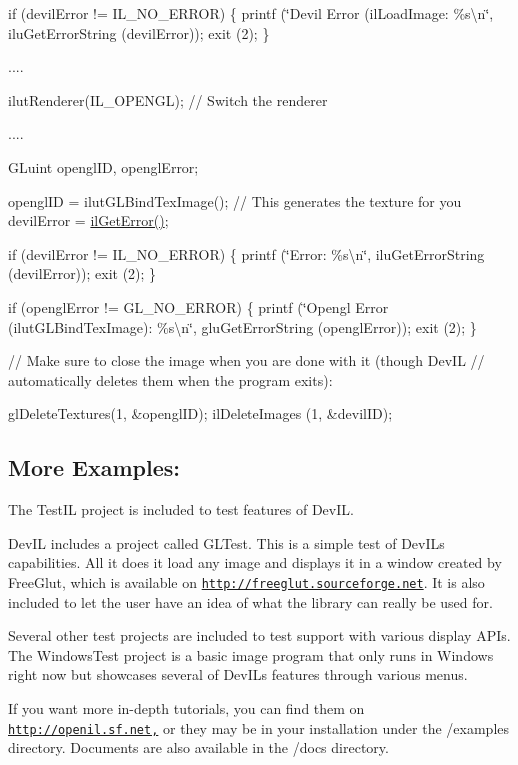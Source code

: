 if (devil\+Error != I\+L\+\_\+\+N\+O\+\_\+\+E\+R\+R\+OR) \{ printf (\char`\"{}\+Devil Error (il\+Load\+Image\+: \%s\textbackslash{}n\char`\"{}, ilu\+Get\+Error\+String (devil\+Error)); exit (2); \}

....

ilut\+Renderer(\+I\+L\+\_\+\+O\+P\+E\+N\+G\+L); // Switch the renderer

....

G\+Luint opengl\+ID, opengl\+Error;

opengl\+ID = ilut\+G\+L\+Bind\+Tex\+Image(); // This generates the texture for you devil\+Error = \hyperlink{il_8h_add4600e363a1e68cf5f5e34e5bce5bac}{il\+Get\+Error()};

if (devil\+Error != I\+L\+\_\+\+N\+O\+\_\+\+E\+R\+R\+OR) \{ printf (\char`\"{}\+Error\+: \%s\textbackslash{}n\char`\"{}, ilu\+Get\+Error\+String (devil\+Error)); exit (2); \}

if (opengl\+Error != G\+L\+\_\+\+N\+O\+\_\+\+E\+R\+R\+OR) \{ printf (\char`\"{}\+Opengl Error (ilut\+G\+L\+Bind\+Tex\+Image)\+: \%s\textbackslash{}n\char`\"{}, glu\+Get\+Error\+String (opengl\+Error)); exit (2); \}

// Make sure to close the image when you are done with it (though Dev\+IL // automatically deletes them when the program exits)\+:

gl\+Delete\+Textures(1, \&opengl\+I\+D); il\+Delete\+Images (1, \&devil\+ID);

\subsection*{More Examples\+: }

The Test\+IL project is included to test features of Dev\+IL.

Dev\+IL includes a project called G\+L\+Test. This is a simple test of Dev\+IL\textquotesingle{}s capabilities. All it does it load any image and displays it in a window created by Free\+Glut, which is available on \href{http://freeglut.sourceforge.net}{\tt http\+://freeglut.\+sourceforge.\+net}. It is also included to let the user have an idea of what the library can really be used for.

Several other test projects are included to test support with various display A\+P\+Is. The Windows\+Test project is a basic image program that only runs in Windows right now but showcases several of Dev\+IL\textquotesingle{}s features through various menus.

If you want more in-\/depth tutorials, you can find them on \href{http://openil.sf.net,}{\tt http\+://openil.\+sf.\+net,} or they may be in your installation under the /examples directory. Documents are also available in the /docs directory.

